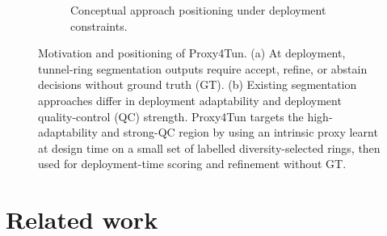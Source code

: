 \documentclass[a4paper,fleqn]{cas-dc}
\begin{document}
{\begin{figure}[t]
\begin{subfigure}{0.98\textwidth}
\caption{Conceptual approach positioning under deployment constraints.}
\end{subfigure}

\caption{
Motivation and positioning of Proxy4Tun.
(a) At deployment, tunnel-ring segmentation outputs require accept, refine, or abstain decisions without ground truth (GT).
(b) Existing segmentation approaches differ in deployment adaptability and deployment quality-control (QC) strength. Proxy4Tun targets the high-adaptability and strong-QC region by using an intrinsic proxy learnt at design time on a small set of labelled diversity-selected rings, then used for deployment-time scoring and refinement without GT.
}
\label{fig:proxy4tun_motivation_positioning}
\end{figure}




\FloatBarrier %
\section{Related work}\label{sec:related}




}
\end{document}
